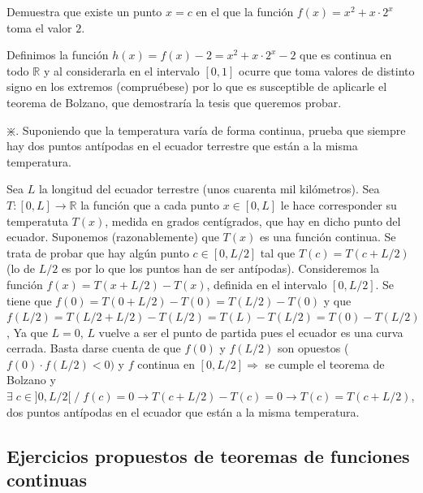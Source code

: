 	
	\begin{ejre} 	Demuestra que existe un punto $x=c$ en el que la función $f(x)=x^2+x\cdot 2^x$ toma el valor $2$. 	
	\end{ejre}
	
	\begin{proofw}\renewcommand{\qedsymbol}{$\diamond$}
	Definimos la función $h(x)=f(x)-2=x^2+x\cdot 2^x - 2$ que es continua en todo $\mathbb R$ y al considerarla en el intervalo $[0,1]$ ocurre que toma valores de distinto signo en los extremos (compruébese) por lo que es susceptible de aplicarle el teorema de Bolzano, que demostraría la tesis que queremos probar.
	
	\end{proofw}
	
	\begin{ejre} 	$\divideontimes$. Suponiendo que la temperatura varía de forma continua, prueba que siempre hay dos puntos antípodas en el ecuador terrestre que están a la misma temperatura. 	
	\end{ejre}
	\begin{proofw}\renewcommand{\qedsymbol}{$\diamond$}
	
	Sea $L$ la longitud del ecuador terrestre (unos cuarenta mil kilómetros). Sea $T:[0,L]\to \mathbb R$	la función que a cada punto $x\in[0,L]$ le hace corresponder su temperatuta $T(x)$, medida en grados centígrados, que hay en dicho punto del ecuador. Suponemos (razonablemente) que $T(x)$ es una función continua. Se trata de probar que hay algún punto $c\in [0,L/2]$ tal que $T(c)=T(c+L/2)$ (lo de $L/2$ es por lo que los puntos han de ser antípodas). Consideremos la función $f(x)=T(x+L/2)-T(x)$, definida en el intervalo $[0,L/2]$. Se tiene que $f(0)=T(0+L/2)-T(0)=T(L/2)-T(0)$ y que $f(L/2)=T(L/2+L/2)-T(L/2)=T(L)-T(L/2)=T(0)-T(L/2)$, Ya que $L=0$, $L$ vuelve a ser el punto de partida pues el ecuador es una curva cerrada. Basta darse cuenta de que $f(0)$ y $f(L/2)$ son opuestos ($f(0)\cdot f(L/2)<0)$ y $f$ continua en $[0,L/2] \Rightarrow$ se cumple el teorema de Bolzano y $\exists \; c \in ]0,L/2[ \; / \; f(c)=0 \to T(c+L/2)-T(c)=0 \to T(c)=T(c+L/2)$, dos puntos antípodas en el ecuador que están a la misma temperatura.
	\end{proofw}

	
	\subsection{Ejercicios propuestos de teoremas de funciones continuas}
	
